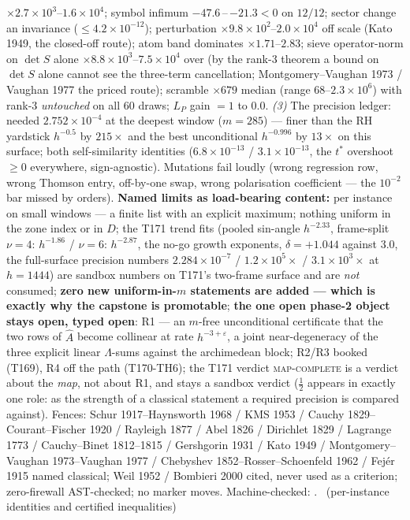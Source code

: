 $\times2.7\times10^{3}$--$1.6\times10^{4}$; symbol infimum
$-47.6$\,--\,$-21.3<0$ on $12/12$; sector change an invariance
($\le4.2\times10^{-12}$); perturbation $\times9.8\times10^{2}$--$2.0
\times10^{4}$ off scale (Kato 1949, the closed-off route); atom band
dominates $\times1.71$--$2.83$; sieve operator-norm on $\det S$ alone
$\times8.8\times10^{3}$--$7.5\times10^{4}$ over (by the rank-3 theorem
a bound on $\det S$ alone cannot see the three-term cancellation;
Montgomery--Vaughan 1973 / Vaughan 1977 the priced route); scramble
$\times679$ median (range $68$--$2.3\times10^{6}$) with rank-3
\emph{untouched} on all $60$ draws; $L_P$ gain $=1$ to $0.0$.
\emph{(3)} The precision ledger: needed $2.752\times10^{-4}$ at the
deepest window ($m=285$) --- finer than the RH yardstick $h^{-0.5}$ by
$215\times$ and the best unconditional $h^{-0.996}$ by $13\times$ on
this surface; both self-similarity identities ($6.8\times10^{-13}$ /
$3.1\times10^{-13}$, the $t^*$ overshoot $\ge0$ everywhere,
sign-agnostic). Mutations fail loudly (wrong regression row, wrong
Thomson entry, off-by-one swap, wrong polarisation coefficient ---
the $10^{-2}$ bar missed by orders).
\textbf{Named limits as load-bearing content:} per instance on small
windows --- a finite list with an explicit maximum; nothing uniform in
the zone index or in $D$; the T171 trend fits (pooled sin-angle
$h^{-2.33}$, frame-split $\nu=4$: $h^{-1.86}$ / $\nu=6$: $h^{-2.87}$,
the no-go growth exponents, $\delta=+1.044$ against $3.0$, the
full-surface precision numbers $2.284\times10^{-7}$ /
$1.2\times10^{5}\times$ / $3.1\times10^{3}\times$ at $h=1444$) are
sandbox numbers on T171's two-frame surface and are \emph{not}
consumed; \textbf{zero new uniform-in-$m$ statements are added ---
which is exactly why the capstone is promotable}; \textbf{the one open
phase-2 object stays open, typed open}: R1 --- an $m$-free
unconditional certificate that the two rows of $\hat A$ become
collinear at rate $h^{-3+\varepsilon}$, a joint near-degeneracy of the
three explicit linear $\Lambda$-sums against the archimedean block;
R2/R3 booked (T169), R4 off the path (T170-TH6); the T171 verdict
\textsc{map-complete} is a verdict about the \emph{map}, not about R1,
and stays a sandbox verdict ($\tfrac12$ appears in exactly one role:
as the strength of a classical statement a required precision is
compared against).
Fences: Schur 1917--Haynsworth 1968 / KMS 1953 / Cauchy
1829--Courant--Fischer 1920 / Rayleigh 1877 / Abel 1826 / Dirichlet
1829 / Lagrange 1773 / Cauchy--Binet 1812--1815 / Gershgorin 1931 /
Kato 1949 / Montgomery--Vaughan 1973--Vaughan 1977 / Chebyshev
1852--Rosser--Schoenfeld 1962 / Fej\'er 1915 named classical; Weil
1952 / Bombieri 2000 cited, never used as a criterion; zero-firewall
AST-checked; no marker moves.
Machine-checked: .
\mE\ (per-instance identities and certified inequalities)


